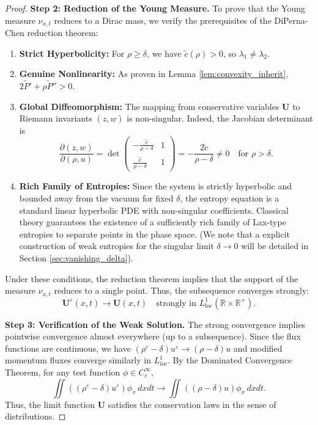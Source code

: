\documentclass[12pt, reqno]{article}
\theoremstyle{definition}
\numberwithin{equation}{section}
\begin{document}
\begin{proof}
\textbf{Step 2: Reduction of the Young Measure.}
To prove that the Young measure $\nu_{x,t}$ reduces to a Dirac mass, we verify the prerequisites of the DiPerna-Chen reduction theorem:
\begin{enumerate}
    \item \textbf{Strict Hyperbolicity:} For $\rho \ge \delta$, we have $\tilde{c}(\rho) > 0$, so $\lambda_1 \neq \lambda_2$.
    \item \textbf{Genuine Nonlinearity:} As proven in Lemma \ref{lem:convexity_inherit}, $2\tilde{P}' + \rho\tilde{P}'' > 0$.
    \item \textbf{Global Diffeomorphism:} The mapping from conservative variables $\mathbf{U}$ to Riemann invariants $(z, w)$ is non-singular. Indeed, the Jacobian determinant is
    \[
    \frac{\partial(z, w)}{\partial(\rho, u)} = \det \begin{pmatrix} -\frac{\tilde{c}}{\rho-\delta} & 1 \\ \frac{\tilde{c}}{\rho-\delta} & 1 \end{pmatrix} = -\frac{2\tilde{c}}{\rho-\delta} \neq 0 \quad \text{for } \rho > \delta.
    \]
    \item \textbf{Rich Family of Entropies:} Since the system is strictly hyperbolic and bounded away from the vacuum for fixed $\delta$, the entropy equation is a standard linear hyperbolic PDE with non-singular coefficients. Classical theory guarantees the existence of a sufficiently rich family of Lax-type entropies to separate points in the phase space. (We note that a explicit construction of weak entropies for the singular limit $\delta \to 0$ will be detailed in Section \ref{sec:vanishing_delta}).
\end{enumerate}
Under these conditions, the reduction theorem implies that the support of the measure $\nu_{x,t}$ reduces to a single point. Thus, the subsequence converges strongly:
\[
\mathbf{U}^\varepsilon(x,t) \to \mathbf{U}(x,t) \quad \text{strongly in } L^1_{\mathrm{loc}}(\mathbb{R} \times \mathbb{R}^+).
\]

\textbf{Step 3: Verification of the Weak Solution.}
The strong convergence implies pointwise convergence almost everywhere (up to a subsequence). Since the flux functions are continuous, we have $(\rho^\varepsilon - \delta)u^\varepsilon \to (\rho - \delta)u$ and modified momentum fluxes converge similarly in $L^1_{loc}$.
By the Dominated Convergence Theorem, for any test function $\phi \in C_c^\infty$,
\[
\iint \left( (\rho^\varepsilon - \delta)u^\varepsilon \right) \phi_x \, dx dt \to \iint \left( (\rho - \delta)u \right) \phi_x \, dx dt.
\]
Thus, the limit function $\mathbf{U}$ satisfies the conservation laws in the sense of distributions.


\end{proof}
\end{document}
